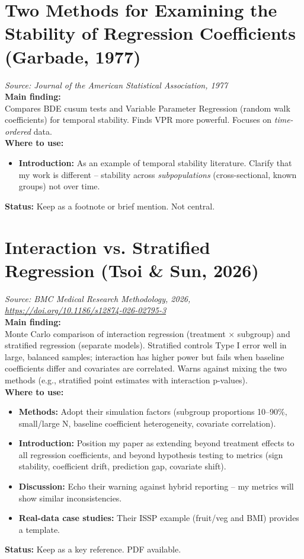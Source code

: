 \documentclass[11pt]{article}
\begin{document}
\section{Two Methods for Examining the Stability of Regression Coefficients (Garbade, 1977)}
\textit{Source: Journal of the American Statistical Association, 1977} \\
\textbf{Main finding:} \\
Compares BDE cusum tests and Variable Parameter Regression (random walk coefficients) for temporal stability. Finds VPR more powerful. Focuses on \emph{time-ordered} data. \\
\textbf{Where to use:}
\begin{itemize}
    \item \textbf{Introduction:} As an example of temporal stability literature. Clarify that my work is different – stability across \emph{subpopulations} (cross-sectional, known groups) not over time.
\end{itemize}
\textbf{Status:} Keep as a footnote or brief mention. Not central.

\section{Interaction vs. Stratified Regression (Tsoi \& Sun, 2026)}
\textit{Source: BMC Medical Research Methodology, 2026, \url{https://doi.org/10.1186/s12874-026-02795-3}} \\
\textbf{Main finding:} \\
Monte Carlo comparison of interaction regression (treatment $\times$ subgroup) and stratified regression (separate models). Stratified controls Type I error well in large, balanced samples; interaction has higher power but fails when baseline coefficients differ and covariates are correlated. Warns against mixing the two methods (e.g., stratified point estimates with interaction p-values). \\
\textbf{Where to use:}
\begin{itemize}
    \item \textbf{Methods:} Adopt their simulation factors (subgroup proportions 10–90\%, small/large N, baseline coefficient heterogeneity, covariate correlation).
    \item \textbf{Introduction:} Position my paper as extending beyond treatment effects to all regression coefficients, and beyond hypothesis testing to metrics (sign stability, coefficient drift, prediction gap, covariate shift).
    \item \textbf{Discussion:} Echo their warning against hybrid reporting – my metrics will show similar inconsistencies.
    \item \textbf{Real-data case studies:} Their ISSP example (fruit/veg and BMI) provides a template.
\end{itemize}
\textbf{Status:} Keep as a key reference. PDF available.
\end{document}
